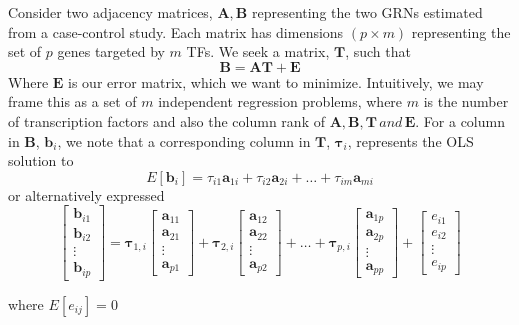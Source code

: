 \documentclass[english]{article}
\begin{document}
Consider two adjacency matrices, $\mathbf{A},\mathbf{B}$ representing
the two GRNs estimated from a case-control study. Each matrix has
dimensions $\left(p\times m\right)$ representing the set of $p$
genes targeted by $m$ TFs. We seek a matrix, $\mathbf{T}$, such
that 
\[
\mathbf{B}=\mathbf{AT}+\mathbf{E}
\]
Where $\mathbf{E}$ is our error matrix, which we want to minimize.
Intuitively, we may frame this as a set of $m$ independent regression
problems, where $m$ is the number of transcription factors and also
the column rank of $\mathbf{A},\mathbf{B},\mathbf{T}\,and\,\mathbf{E}$.
For a column in $\mathbf{B}$, $\mathbf{b}_{i}$, we note that a corresponding
column in $\mathbf{T}$, $\mathbf{\tau}_{i}$, represents the OLS
solution to
\[
E\left[\mathbf{b}_{i}\right]=\tau_{i1}\mathbf{a}_{1i}+\tau_{i2}\mathbf{a}_{2i}+\dots+\tau_{im}\mathbf{a}_{mi}
\]
or alternatively expressed 
\[
\left[\begin{array}{c}
\mathbf{b}_{i1}\\
\mathbf{b}_{i2}\\
\vdots\\
\mathbf{b}_{ip}
\end{array}\right]=\mathbf{\tau}_{1,i}\left[\begin{array}{c}
\mathbf{a}_{11}\\
\mathbf{a}_{21}\\
\vdots\\
\mathbf{a}_{p1}
\end{array}\right]+\mathbf{\tau}_{2,i}\left[\begin{array}{c}
\mathbf{a}_{12}\\
\mathbf{a}_{22}\\
\vdots\\
\mathbf{a}_{p2}
\end{array}\right]+\dots+\mathbf{\tau}_{p,i}\left[\begin{array}{c}
\mathbf{a}_{1p}\\
\mathbf{a}_{2p}\\
\vdots\\
\mathbf{a}_{pp}
\end{array}\right]+\left[\begin{array}{c}
e_{i1}\\
e_{i2}\\
\vdots\\
e_{ip}
\end{array}\right]
\]


where $E\left[e_{ij}\right]=0$ 
\end{document}
